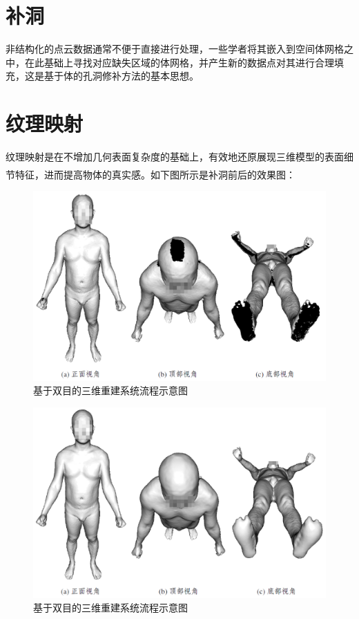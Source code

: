 \documentclass[10pt]{article}
\newcommand{\upcite}[1]{\textsuperscript{\textsuperscript{\cite{#1}}}}
\begin{document}
\section{补洞}
非结构化的点云数据通常不便于直接进行处理，一些学者将其嵌入到空间体网格之中，在此基础上寻找对应缺失区域的体网格，并产生新的数据点对其进行合理填充，这是基于体的孔洞修补方法的基本思想。
\section{纹理映射}
纹理映射是在不增加几何表面复杂度的基础上，有效地还原展现三维模型的表面细节特征，进而提高物体的真实感\upcite{texture_mapping01}。如下图所示是补洞前后的效果图：
\begin{figure}[H]
\begin{center}
\includegraphics[scale=0.25]{filling-hole.png}
\caption{基于双目的三维重建系统流程示意图}
\end{center}
\end{figure}

\begin{figure}[H]
\begin{center}
\includegraphics[scale=0.25]{filling-hole-effect.png}
\caption{基于双目的三维重建系统流程示意图}
\end{center}
\end{figure}
\end{document}
